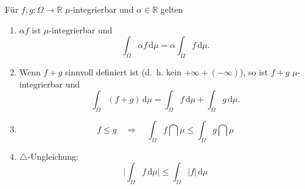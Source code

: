 \begin{lemma}\label{properties}
	F\"ur $ f, g \! : \Omega \rightarrow \overline{\mathbb{R}}$ $\mu$-integrierbar und $\alpha \in \mathbb{R}$ gelten
	\begin{enumerate}[label=(\roman*)]
		\item $\alpha f$ ist $\mu$-integrierbar und \[ \int_{\Omega} \alpha f \,\mathrm{d}\mu = \alpha \int_{\Omega} f\, \mathrm{d}\mu. \]
		\item Wenn $f+g$ sinnvoll definiert ist (\mbox{d. h.} kein $+\infty + (-\infty)$), so ist $f + g$ $\mu$-integrierbar und \[ \int_{\Omega} (f + g) \,\mathrm{d}\mu = \int_{\Omega} f \,\mathrm{d}\mu + \int_{\Omega} g\, \mathrm{d}\mu. \]
		\item \[ f \leq g \quad \Rightarrow \quad \int_{\Omega} f \dint \mu \leq \int_{\Omega} g \dint \mu \]
		\item $\triangle$-Ungleichung: 
		\[ \Big|\int_{\Omega} f \,\mathrm{d}\mu\Big| \leq \int_{\Omega} |f| \,\mathrm{d}\mu\]
	\end{enumerate}
\end{lemma}

